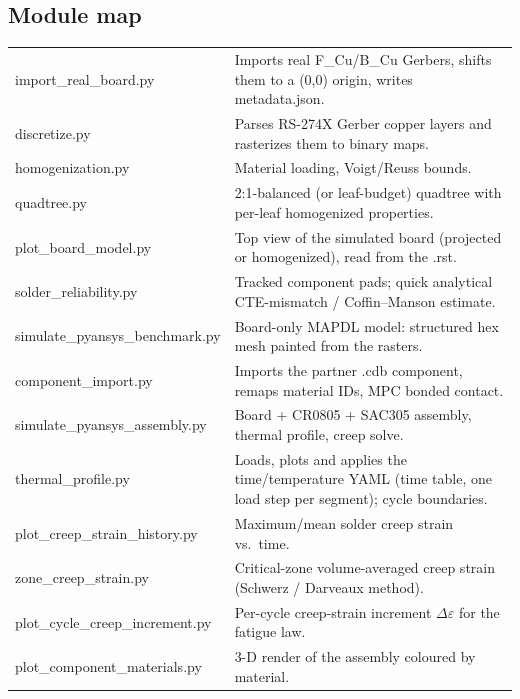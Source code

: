 \documentclass[10pt,a4paper]{article}
\newcommand{\brkus}{\textunderscore\allowbreak}
\newcommand{\code}[1]{{\small\ttfamily\let\_\brkus #1}}
\begin{document}
\subsection*{Module map}
{\small
\begin{tabularx}{\linewidth}{@{}>{\ttfamily\footnotesize}p{55mm}X@{}}
\toprule
import\_real\_board.py           & Imports real F\_Cu/B\_Cu Gerbers, shifts them to a (0,0) origin, writes \code{metadata.json}. \\
discretize.py                    & Parses RS-274X Gerber copper layers and rasterizes them to binary maps. \\
homogenization.py                & Material loading, Voigt/Reuss bounds. \\
quadtree.py                      & 2:1-balanced (or leaf-budget) quadtree with per-leaf homogenized properties. \\
plot\_board\_model.py            & Top view of the simulated board (projected or homogenized), read from the \code{.rst}. \\
solder\_reliability.py           & Tracked component pads; quick analytical CTE-mismatch / Coffin--Manson estimate. \\
simulate\_pyansys\_benchmark.py  & Board-only MAPDL model: structured hex mesh painted from the rasters. \\
component\_import.py             & Imports the partner \code{.cdb} component, remaps material IDs, MPC bonded contact. \\
simulate\_pyansys\_assembly.py   & Board + CR0805 + SAC305 assembly, thermal profile, creep solve. \\
thermal\_profile.py              & Loads, plots and applies the time/temperature YAML (time table, one load step per segment); cycle boundaries. \\
plot\_creep\_strain\_history.py  & Maximum/mean solder creep strain vs.\ time. \\
zone\_creep\_strain.py           & Critical-zone volume-averaged creep strain (Schwerz / Darveaux method). \\
plot\_cycle\_creep\_increment.py & Per-cycle creep-strain increment $\Delta\varepsilon$ for the fatigue law. \\
plot\_component\_materials.py    & 3-D render of the assembly coloured by material. \\
\bottomrule
\end{tabularx}
}

\newpage
\end{document}
